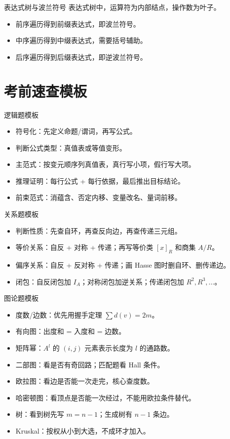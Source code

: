 \documentclass[UTF8,zihao=-4]{ctexart}
\begin{document}
\begin{corebox}{表达式树与波兰符号}
表达式树中，运算符为内部结点，操作数为叶子。
\begin{itemize}
  \item 前序遍历得到前缀表达式，即波兰符号。
  \item 中序遍历得到中缀表达式，需要括号辅助。
  \item 后序遍历得到后缀表达式，即逆波兰符号。
\end{itemize}
\end{corebox}

\section{考前速查模板}

\begin{exambox}{逻辑题模板}
\begin{itemize}
  \item 符号化：先定义命题/谓词，再写公式。
  \item 判断公式类型：真值表或等值变形。
  \item 主范式：按变元顺序列真值表，真行写小项，假行写大项。
  \item 推理证明：每行公式 + 每行依据，最后推出目标结论。
  \item 前束范式：消蕴含、否定内移、变量改名、量词前移。
\end{itemize}
\end{exambox}

\begin{exambox}{关系题模板}
\begin{itemize}
  \item 判断性质：先查自环，再查反向边，再查传递三元组。
  \item 等价关系：自反 + 对称 + 传递；再写等价类 $[x]_R$ 和商集 $A/R$。
  \item 偏序关系：自反 + 反对称 + 传递；画 Hasse 图时删自环、删传递边。
  \item 闭包：自反闭包加 $I_A$；对称闭包加逆关系；传递闭包加 $R^2,R^3,\ldots$。
\end{itemize}
\end{exambox}

\begin{exambox}{图论题模板}
\begin{itemize}
  \item 度数/边数：优先用握手定理 $\sum d(v)=2m$。
  \item 有向图：出度和 = 入度和 = 边数。
  \item 矩阵幂：$A^l$ 的 $(i,j)$ 元素表示长度为 $l$ 的通路数。
  \item 二部图：看是否有奇回路；匹配题看 Hall 条件。
  \item 欧拉图：看边是否能一次走完，核心查度数。
  \item 哈密顿图：看顶点是否能一次经过，不能用欧拉条件替代。
  \item 树：看到树先写 $m=n-1$；生成树有 $n-1$ 条边。
  \item Kruskal：按权从小到大选，不成环才加入。
\end{itemize}
\end{exambox}
\end{document}
